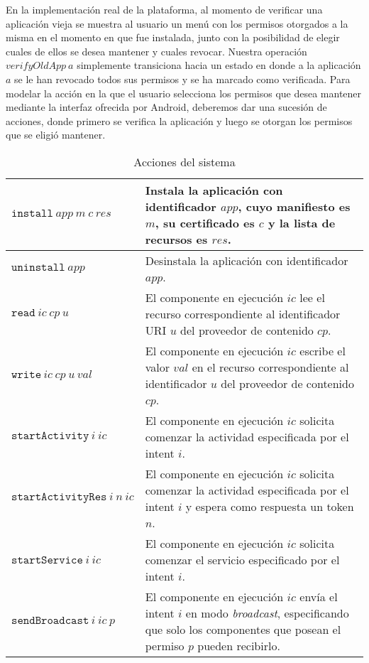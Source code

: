 En la implementación real de la plataforma, al momento de verificar una aplicación vieja se muestra al
usuario un menú con los permisos otorgados a la misma en el momento en que fue instalada, junto
con la posibilidad de elegir cuales de ellos se desea mantener y cuales revocar. Nuestra operación
$verifyOldApp\ a$ simplemente transiciona hacia un estado en donde a la aplicación $a$ se le han
revocado todos sus permisos y se ha marcado como verificada. Para modelar la acción en la que el
usuario selecciona los permisos que desea mantener mediante la interfaz ofrecida por Android,
deberemos dar una sucesión de acciones,  donde primero se verifica la aplicación y luego se otorgan
los permisos que se eligió mantener.


\begin{table}
\caption{Acciones del sistema}
\label{table:actions}
\vspace{0.2cm}
\small
\begin{tabularx}{\linewidth}{|l X|}
	\hline
	$\mathtt{install}~app~m~c~res$	& Instala la aplicación con identificador $app$, cuyo manifiesto es $m$, su certificado es $c$ y la lista de recursos es $res$. \\
	\hline
	$\mathtt{uninstall}~app$	& Desinstala la aplicación con identificador $app$. \\
	\hline
	$\mathtt{read}~ic~cp~u$	& El componente en ejecución $ic$ lee el recurso correspondiente al identificador URI $u$ del proveedor de contenido $cp$. \\
	\hline
	$\mathtt{write}~ic~cp~u~val$	& El componente en ejecución $ic$ escribe el valor $val$ en el recurso correspondiente al identificador $u$ del proveedor de contenido $cp$. \\
	\hline
	$\mathtt{startActivity}~i~ic$	& El componente en ejecución $ic$ solicita comenzar la actividad especificada por el intent $i$. \\
	\hline
	$\mathtt{startActivityRes}~i~n~ic$	& El componente en ejecución $ic$ solicita comenzar la actividad especificada por el intent $i$ y espera como respuesta un token $n$. \\
	\hline
	$\mathtt{startService}~i~ic$	& El componente en ejecución $ic$ solicita comenzar el servicio especificado por el intent $i$. \\
	\hline
	$\mathtt{sendBroadcast}~i~ic~p$	& El componente en ejecución $ic$ envía el intent $i$ en modo \textit{broadcast}, especificando que solo los componentes que posean el permiso $p$ pueden recibirlo. \\
	\hline

\end{tabularx}
\end{table}

